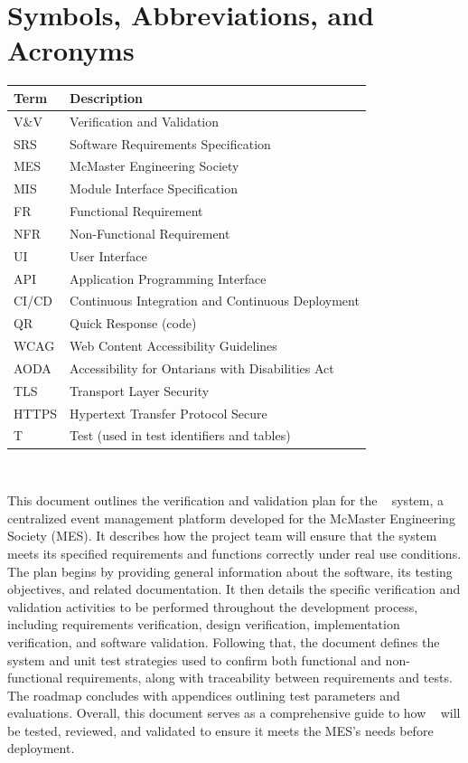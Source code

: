 \documentclass[12pt, titlepage]{article}
\begin{document}
\newpage

\tableofcontents

\listoftables


\newpage

\section{Symbols, Abbreviations, and Acronyms}

\renewcommand{\arraystretch}{1.2}
\begin{tabularx}{\textwidth}{p{3.2cm}X}
  \toprule
  \textbf{Term} & \textbf{Description}\\
  \midrule
  V\&V & Verification and Validation\\
  SRS & Software Requirements Specification\\
  MES & McMaster Engineering Society\\
  MIS & Module Interface Specification\\
  FR & Functional Requirement\\
  NFR & Non-Functional Requirement\\
  UI & User Interface\\
  API & Application Programming Interface\\
  CI/CD & Continuous Integration and Continuous Deployment\\
  QR & Quick Response (code)\\
  WCAG & Web Content Accessibility Guidelines\\
  AODA & Accessibility for Ontarians with Disabilities Act\\
  TLS & Transport Layer Security\\
  HTTPS & Hypertext Transfer Protocol Secure\\
  T & Test (used in test identifiers and tables)\\
  \bottomrule
\end{tabularx}\\

\newpage


This document outlines the verification and validation plan for the \teamname~ system, a centralized event management
platform developed for the McMaster Engineering Society (MES). It describes how the project team will ensure that the
system meets its specified requirements and functions correctly under real use conditions. The plan begins by providing
general information about the software, its testing objectives, and related documentation. It then details the specific
verification and validation activities to be performed throughout the development process, including requirements
verification, design verification, implementation verification, and software validation. Following that, the document
defines the system and unit test strategies used to confirm both functional and non-functional requirements, along with
traceability between requirements and tests. The roadmap concludes with appendices outlining test parameters and
evaluations. Overall, this document serves as a comprehensive guide to how \teamname~ will be tested, reviewed, and
validated to ensure it meets the MES’s needs before deployment.
\end{document}
